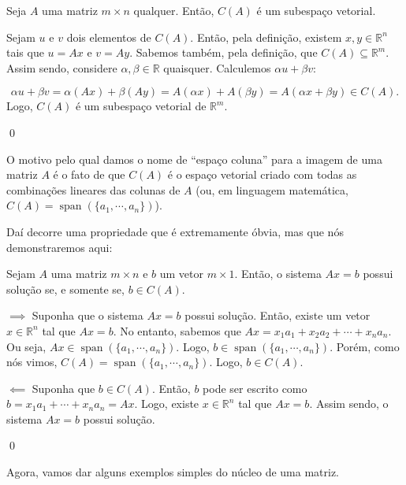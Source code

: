 \begin{Proposition}
	Seja $A$ uma matriz $m\times n$ qualquer. Então, $C(A)$ é um subespaço vetorial.
\end{Proposition}

\begin{Proof}
	Sejam $u$ e $v$ dois elementos de $C(A)$. Então, pela definição, existem $x, y\in\mathbb{R}^n$ tais que $u = Ax$ e $v = Ay$. Sabemos também, pela definição, que $C(A)\subseteq\mathbb{R}^m$. Assim sendo, considere $\alpha, \beta\in\mathbb{R}$ quaisquer. Calculemos $\alpha u + \beta v$:
	
	$$
	\alpha u + \beta v = \alpha (Ax) + \beta (Ay) = A(\alpha x) + A(\beta y) = A(\alpha x + \beta y)\in C(A).
	$$
	Logo, $C(A)$ é um subespaço vetorial de $\mathbb{R}^m$.
	
	\qed
\end{Proof}

O motivo pelo qual damos o nome de ``espaço coluna'' para a imagem de uma matriz $A$ é o fato de que $C(A)$ é o espaço vetorial criado com todas as combinações lineares das colunas de $A$ (ou, em linguagem matemática, $C(A) = \operatorname{span}(\{a_1, \cdots, a_n\})$).

Daí decorre uma propriedade que é extremamente óbvia, mas que nós demonstraremos aqui:

\begin{Proposition}
	Sejam $A$ uma matriz $m\times n$ e $b$ um vetor $m\times 1$. Então, o sistema $Ax = b$ possui solução se, e somente se, $b\in C(A)$.
\end{Proposition}

\begin{Proof}
	$\implies$ Suponha que o sistema $Ax = b$ possui solução. Então, existe um vetor $x\in\mathbb{R}^n$ tal que $Ax = b$. No entanto, sabemos que $Ax = x_1a_1 + x_2a_2 + \cdots + x_na_n$. Ou seja, $Ax\in\operatorname{span}(\{a_1, \cdots, a_n\})$. Logo, $b\in\operatorname{span}(\{a_1, \cdots, a_n\})$. Porém, como nós vimos, $C(A) = \operatorname{span}(\{a_1, \cdots, a_n\})$. Logo, $b\in C(A)$.
	
	$\impliedby$ Suponha que $b\in C(A)$. Então, $b$ pode ser escrito como $b = x_1a_1 + \cdots + x_na_n = Ax$. Logo, existe $x\in\mathbb{R}^n$ tal que $Ax = b$. Assim sendo, o sistema $Ax = b$ possui solução.
	
	\qed
\end{Proof}

Agora, vamos dar alguns exemplos simples do núcleo de uma matriz.

